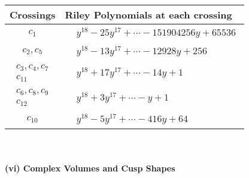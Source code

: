 \documentclass[1p]{elsarticle_modified}
\theoremstyle{definition}
\begin{document}
\begin{tabular}{m{50pt}|m{274pt}}
Crossings & \hspace{64pt}Riley Polynomials at each crossing \\
\hline $$\begin{aligned}c_{1}\end{aligned}$$&$\begin{aligned}
&y^{18}-25 y^{17}+\cdots-151904256 y+65536
\end{aligned}$\\
\hline $$\begin{aligned}c_{2},c_{5}\end{aligned}$$&$\begin{aligned}
&y^{18}-13 y^{17}+\cdots-12928 y+256
\end{aligned}$\\
\hline $$\begin{aligned}c_{3},c_{4},c_{7}\\c_{11}\end{aligned}$$&$\begin{aligned}
&y^{18}+17 y^{17}+\cdots-14 y+1
\end{aligned}$\\
\hline $$\begin{aligned}c_{6},c_{8},c_{9}\\c_{12}\end{aligned}$$&$\begin{aligned}
&y^{18}+3 y^{17}+\cdots- y+1
\end{aligned}$\\
\hline $$\begin{aligned}c_{10}\end{aligned}$$&$\begin{aligned}
&y^{18}-5 y^{17}+\cdots-416 y+64
\end{aligned}$\\
\hline
\end{tabular}\\~\\
\newpage\flushleft \textbf{(vi) Complex Volumes and Cusp Shapes}
\end{document}

